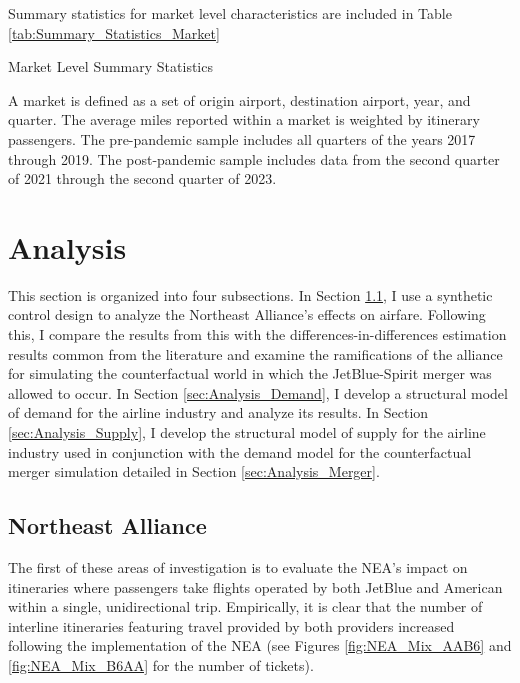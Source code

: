 \documentclass{article}
\let\Oldsubsection\subsection
\renewcommand{\subsection}{\FloatBarrier\Oldsubsection}
\begin{document}
    Summary statistics for market level characteristics are included in Table \ref{tab:Summary_Statistics_Market}

    \begin{table}
        \caption{Market Level Summary Statistics}
        \label{tab:Summary_Statistics_Market}
        
        \footnotesize{A market is defined as a set of origin airport, destination airport, year, and quarter. The average miles reported within a market is weighted by itinerary passengers. The pre-pandemic sample includes all quarters of the years 2017 through 2019. The post-pandemic sample includes data from the second quarter of 2021 through the second quarter of 2023. }
    \end{table}

	\section{Analysis}
	\label{sec:Analysis}
	
	This section is organized into four subsections. In Section \ref{sec:Analysis_NEA}, I use a synthetic control design to analyze the Northeast Alliance's effects on airfare. Following this, I compare the results from this with the differences-in-differences estimation results common from the literature and examine the ramifications of the alliance for simulating the counterfactual world in which the JetBlue-Spirit merger was allowed to occur. In Section \ref{sec:Analysis_Demand}, I develop a structural model of demand for the airline industry and analyze its results. In Section \ref{sec:Analysis_Supply}, I develop the structural model of supply for the airline industry used in conjunction with the demand model for the counterfactual merger simulation detailed in Section \ref{sec:Analysis_Merger}. 
	
	\subsection{Northeast Alliance}
	\label{sec:Analysis_NEA}

    
        
	The first of these areas of investigation is to evaluate the NEA's impact on itineraries where passengers take flights operated by both JetBlue and American within a single, unidirectional trip. Empirically, it is clear that the number of interline itineraries featuring travel provided by both providers increased following the implementation of the NEA (see Figures \ref{fig:NEA_Mix_AAB6} and \ref{fig:NEA_Mix_B6AA} for the number of tickets). 
	
\end{document}
